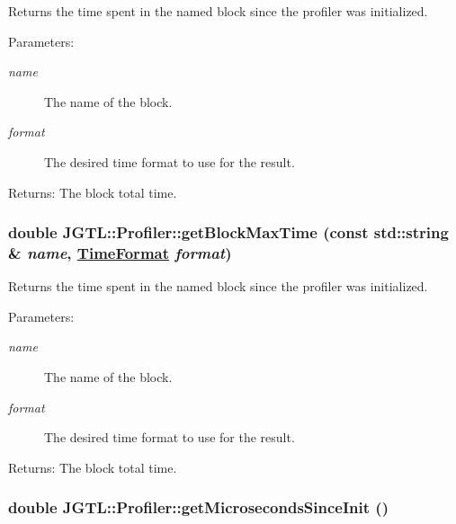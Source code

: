 Returns the time spent in the named block since the profiler was initialized.

\begin{Desc}
\item[Parameters:]
\begin{description}
\item[{\em name}]The name of the block. \item[{\em format}]The desired time format to use for the result. \end{description}
\end{Desc}
\begin{Desc}
\item[Returns:]The block total time. \end{Desc}
\hypertarget{class_j_g_t_l_1_1_profiler_b52d3f1a17f0e589cb898dd28b4b6f08}{
\subsubsection[getBlockMaxTime]{\setlength{\rightskip}{0pt plus 5cm}double JGTL::Profiler::get\-Block\-Max\-Time (const std::string \& {\em name}, \hyperlink{namespace_j_g_t_l_11a34d88ecadd1c99354adc21fd5abe6}{Time\-Format} {\em format})}}
\label{class_j_g_t_l_1_1_profiler_b52d3f1a17f0e589cb898dd28b4b6f08}


Returns the time spent in the named block since the profiler was initialized.

\begin{Desc}
\item[Parameters:]
\begin{description}
\item[{\em name}]The name of the block. \item[{\em format}]The desired time format to use for the result. \end{description}
\end{Desc}
\begin{Desc}
\item[Returns:]The block total time. \end{Desc}
\hypertarget{class_j_g_t_l_1_1_profiler_dbdbbaa2a9a1590cbcd1f2b5204d27f1}{
\subsubsection[getMicrosecondsSinceInit]{\setlength{\rightskip}{0pt plus 5cm}double JGTL::Profiler::get\-Microseconds\-Since\-Init ()}}
\label{class_j_g_t_l_1_1_profiler_dbdbbaa2a9a1590cbcd1f2b5204d27f1}


